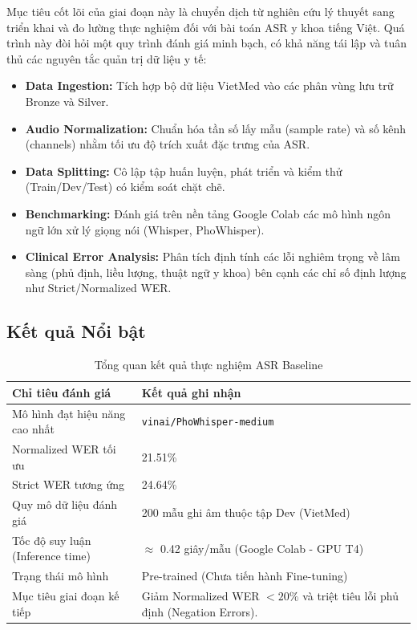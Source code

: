 \documentclass[12pt,a4paper]{article}
\begin{document}
Mục tiêu cốt lõi của giai đoạn này là chuyển dịch từ nghiên cứu lý thuyết sang triển khai và đo lường thực nghiệm đối với bài toán ASR y khoa tiếng Việt. Quá trình này đòi hỏi một quy trình đánh giá minh bạch, có khả năng tái lập và tuân thủ các nguyên tắc quản trị dữ liệu y tế:
\begin{itemize}[leftmargin=1.2cm]
    \item \textbf{Data Ingestion:} Tích hợp bộ dữ liệu VietMed vào các phân vùng lưu trữ Bronze và Silver.
    \item \textbf{Audio Normalization:} Chuẩn hóa tần số lấy mẫu (sample rate) và số kênh (channels) nhằm tối ưu độ trích xuất đặc trưng của ASR.
    \item \textbf{Data Splitting:} Cô lập tập huấn luyện, phát triển và kiểm thử (Train/Dev/Test) có kiểm soát chặt chẽ.
    \item \textbf{Benchmarking:} Đánh giá trên nền tảng Google Colab các mô hình ngôn ngữ lớn xử lý giọng nói (Whisper, PhoWhisper).
    \item \textbf{Clinical Error Analysis:} Phân tích định tính các lỗi nghiêm trọng về lâm sàng (phủ định, liều lượng, thuật ngữ y khoa) bên cạnh các chỉ số định lượng như Strict/Normalized WER.
\end{itemize}

\subsection{Kết quả Nổi bật}

\begin{table}[h]
\centering
\caption{Tổng quan kết quả thực nghiệm ASR Baseline}
\begin{tabularx}{\textwidth}{|l|X|}
\hline
\textbf{Chỉ tiêu đánh giá} & \textbf{Kết quả ghi nhận} \\
\hline
Mô hình đạt hiệu năng cao nhất & \texttt{vinai/PhoWhisper-medium} \\
\hline
Normalized WER tối ưu & 21.51\% \\
\hline
Strict WER tương ứng & 24.64\% \\
\hline
Quy mô dữ liệu đánh giá & 200 mẫu ghi âm thuộc tập Dev (VietMed) \\
\hline
Tốc độ suy luận (Inference time) & $\approx$ 0.42 giây/mẫu (Google Colab - GPU T4) \\
\hline
Trạng thái mô hình & Pre-trained (Chưa tiến hành Fine-tuning) \\
\hline
Mục tiêu giai đoạn kế tiếp & Giảm Normalized WER $< 20\%$ và triệt tiêu lỗi phủ định (Negation Errors). \\
\hline
\end{tabularx}
\end{table}
\end{document}
